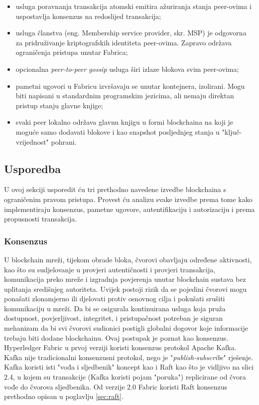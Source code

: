 \documentclass[times, utf8, diplomski]{fer}
\begin{document}
\begin{itemize}

\item usluga poravnanja transakcija atomski emitira ažuriranja stanja peer-ovima i uspostavlja konsenzus na redoslijed transakcija;

\item usluga članstva (eng. Membership service provider, skr. MSP) je odgovorna za pridruživanje kriptografskih identiteta peer-ovima. Zapravo održava ograničenja pristupa unutar Fabrica;

\item opcionalna \textit{peer-to-peer gossip} usluga širi izlaze blokova svim peer-ovima;

\item pametni ugovori u Fabricu izvršavaju se unutar kontejnera, izolirani. Mogu biti napisani u standardnim programskim jezicima, ali nemaju direktan pristup stanju glavne knjige;

\item svaki peer lokalno održava glavnu knjigu u formi blockchaina na koji je moguće samo dodavati blokove i kao snapshot posljednjeg stanja u "ključ-vrijednost" pohrani.

\end{itemize}

\subsection{Usporedba}

U ovoj sekciji usporedit ću tri prethodno navedene izvedbe blockchaina s ograničenim pravom pristupa. Provest ću analizu svake izvedbe prema tome kako implementiraju konsenzus, pametne ugovore, autentifikaciju i autorizaciju i prema propusnosti transakcija.

\subsubsection{Konsenzus}

U blockchain mreži, tijekom obrade bloka, čvorovi obavljaju određene aktivnosti, kao što su sudjelovanje u provjeri autentičnosti i provjeri transakcija, komunikacija preko mreže i izgradnja povjerenja unutar blockchain sustava bez uplitanja središnjeg autoriteta. Uvijek postoji rizik da se pojedini čvorovi mogu ponašati zlonamjerno ili djelovati protiv osnovnog cilja i pokušati srušiti komunikaciju u mreži. Da bi se osigurala kontinuirana usluga koja pruža dostupnost, povjerljivost, integritet, i pristupačnost potreban je siguran mehanizam da bi svi čvorovi sudionici postigli globalni dogovor koje informacije trebaju biti dodane blockchainu. Ovaj postupak je poznat kao konsenzus.
Hyperledger Fabric u prvoj verziji koristi konsenzus protokol Apache Kafka. Kafka nije tradicionalni konsenzusni protokol, nego je "\textit{publish-subscribe}" rješenje. Kafka koristi isti "vođa i sljedbenik" koncept kao i Raft kao što je vidljivo na slici 2.4, u kojem su transakcije (Kafka koristi pojam "poruka") replicirane od čvora vođe do čvorova sljedbenika. Od verzije 2.0 Fabric koristi Raft konsenzus prethodno opisan u poglavlju \ref{sec:raft}. 
\end{document}

